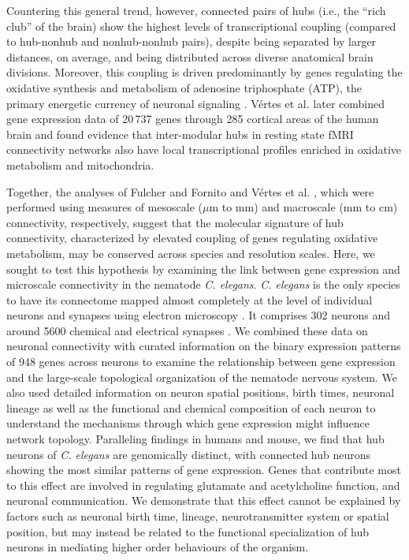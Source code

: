 \documentclass[10pt,letterpaper]{article}
\begin{document}
Countering this general trend, however, connected pairs of hubs (i.e., the ``rich club'' of the brain) show the highest levels of transcriptional coupling (compared to hub-nonhub and nonhub-nonhub pairs), despite being separated by larger distances, on average, and being distributed across diverse anatomical brain divisions.
Moreover, this coupling is driven predominantly by genes regulating the oxidative synthesis and metabolism of adenosine triphosphate (ATP), the primary energetic currency of neuronal signaling \cite{Lennie:2003ia, Laughlin:2003vu}.
V\'ertes et al. \cite{Vertes2016a} later combined gene expression data of 20\,737 genes through 285 cortical areas of the human brain and found evidence that inter-modular hubs in resting state fMRI connectivity networks also have local transcriptional profiles enriched in oxidative metabolism and mitochondria.

Together, the analyses of Fulcher and Fornito \cite{Fulcher:2016ck} and V\'ertes et al. \cite{Vertes2016a}, which were performed using measures of mesoscale ($\mu$m to mm) and macroscale (mm to cm) connectivity, respectively, suggest that the molecular signature of hub connectivity, characterized by elevated coupling of genes regulating oxidative metabolism, may be conserved across species and resolution scales.
Here, we sought to test this hypothesis by examining the link between gene expression and microscale connectivity in the nematode \emph{C. elegans}.
\emph{C. elegans} is the only species to have its connectome mapped almost completely at the level of individual neurons and synapses using electron microscopy \cite{White:1986tx, Varshney2011}.
It comprises 302 neurons and around 5600 chemical and electrical synapses \cite{White:1986tx}.
We combined these data on neuronal connectivity with curated information on the binary expression patterns of 948 genes across neurons to examine the relationship between gene expression and the large-scale topological organization of the nematode nervous system.
We also used detailed information on neuron spatial positions, birth times, neuronal lineage as well as the functional and chemical composition of each neuron to understand the mechanisms through which gene expression might influence network topology.
Paralleling findings in humans and mouse, we find that hub neurons of \emph{C. elegans} are genomically distinct, with connected hub neurons showing the most similar patterns of gene expression.
Genes that contribute most to this effect are involved in regulating glutamate and acetylcholine function, and neuronal communication.
We demonstrate that this effect cannot be explained by factors such as neuronal birth time, lineage, neurotransmitter system or spatial position, but may instead be related to the functional specialization of hub neurons in mediating higher order behaviours of the organism.
\end{document}
